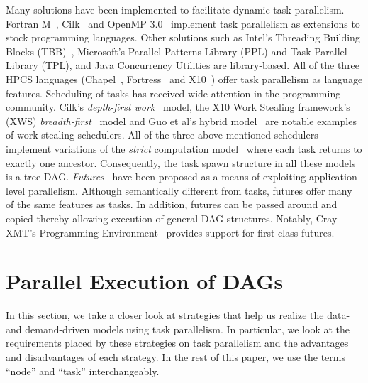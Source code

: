 \documentclass[10pt,conference]{IEEEtran}
\begin{document}
%
%
Many solutions have been implemented to facilitate dynamic task parallelism.
Fortran M~\cite{Foster97}, Cilk~\cite{FrigoLeRa98} and OpenMP
3.0~\cite{kn:omp_30} implement task parallelism as extensions to stock
programming languages. Other solutions such as Intel's Threading Building
Blocks (TBB)~\cite{kn:tbb}, Microsoft's Parallel Patterns Library (PPL) and
Task Parallel Library (TPL), and Java Concurrency Utilities are library-based.
All of the three HPCS languages (Chapel~\cite{Chamberlain:2007p1040},
Fortress~\cite{fortress} and X10~\cite{Charles:2005p1232}) offer task
parallelism as language features. Scheduling of tasks has received wide
attention in the programming community. Cilk's \textit{depth-first
work}~\cite{Blumofe94} model, the X10 Work Stealing framework's (XWS)
\textit{breadth-first}~\cite{Cong08} model and Guo et al's hybrid
model~\cite{Sarkar09} are notable examples of work-stealing schedulers.  All of
the three above mentioned schedulers implement variations of the
\textit{strict} computation model~\cite{Blumofe94} where each task returns to
exactly one ancestor. Consequently, the task spawn structure in all these
models is a tree DAG. 
\textit{Futures}~\cite{Halstead85}  have been proposed as a means of exploiting
application-level parallelism. Although semantically different from tasks, futures offer many
of the same features as tasks.  In addition, futures can be passed around and
copied thereby allowing execution of general DAG structures. Notably, Cray XMT's
Programming Environment~\cite{cray} provides support for first-class futures.

\section{Parallel Execution of DAGs}
\label{sec:parallel} 
In this section, we take a closer look at strategies that help us realize the
data- and demand-driven models using task parallelism.  In particular, we look
at the requirements placed by these strategies on task parallelism and the
advantages and disadvantages of each strategy.  In the rest of this paper, we
use the terms ``node'' and ``task'' interchangeably. 
\end{document}
